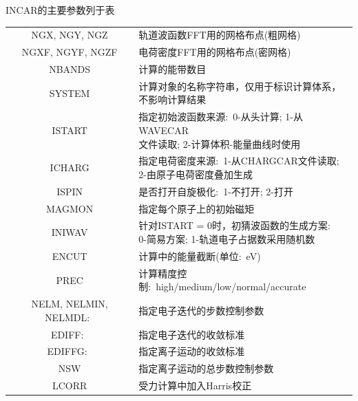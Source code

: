 \textrm{INCAR}的主要参数列于表
\begin{longtable}[c]{|@{\extracolsep{\fill}}c|@{\extracolsep{\fill}}l|}
        \toprule
	\textrm{NGX, NGY, NGZ} &轨道波函数\textrm{FFT}用的网格布点(粗网格)\\
	\textrm{NGXF, NGYF, NGZF} &电荷密度\textrm{FFT}用的网格布点(密网格)\\
	\textrm{NBANDS} &计算的能带数目\\
        \midrule
	\textrm{SYSTEM} &\makecell[tl]{计算对象的名称字符串，仅用于标识计算体系，\\不影响计算结果}\\
	\textrm{ISTART} &\makecell[tl]{指定初始波函数来源:~0-从头计算; 1-从\textrm{WAVECAR}\\文件读取; 2-计算体积-能量曲线时使用}\\
	\textrm{ICHARG} &\makecell[tl]{指定电荷密度来源:~1-从\textrm{CHARGCAR}文件读取; \\2-由原子电荷密度叠加生成}\\
	\textrm{ISPIN} &是否打开自旋极化:~1-不打开; 2-打开\\
	\textrm{MAGMON} & 指定每个原子上的初始磁矩\\
	\textrm{INIWAV} &\makecell[tl]{针对\textrm{ISTART = 0}时，初猜波函数的生成方案:\\0-简易方案; 1-轨道电子占据数采用随机数}\\
	\midrule
	\textrm{ENCUT} &计算中的能量截断(单位:~\textrm{eV})\\
	\textrm{PREC} &计算精度控制:~\textrm{high/medium/low/normal/accurate}\\
	\textrm{NELM, NELMIN, NELMDL}:~ &指定电子迭代的步数控制参数\\
	\textrm{EDIFF}:~ &指定电子迭代的收敛标准\\
	\textrm{EDIFFG}:~ &指定离子运动的收敛标准\\
	\midrule
	\textrm{NSW} & 指定离子运动的总步数控制参数\\
	\textrm{LCORR} &受力计算中加入\textrm{Harris}校正\\

\end{longtable}
